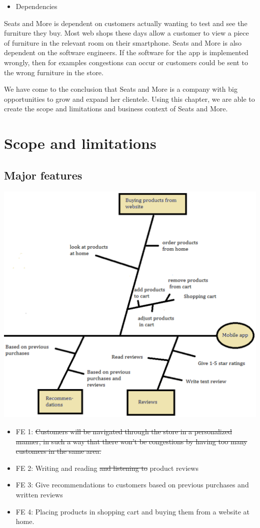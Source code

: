 \documentclass[a4paper]{article}
\begin{document}
\begin{itemize}
\item Dependencies
\end{itemize}
Seats and More is dependent on customers actually wanting to test and see the furniture they buy. Most web shops these days allow a customer to view a piece of furniture in the relevant room on their smartphone.
Seats and More is also dependent on the software engineers. If the software for the app is implemented wrongly, then for examples congestions can occur or customers could be sent to the wrong furniture in the store.

We have come to the conclusion that Seats and More is a company with big opportunities to grow and expand her clientele. Using this chapter, we are able to create the scope and limitations and business context of Seats and More.


\section{Scope and limitations}
\subsection*{Major features}
\includegraphics[scale=0.7]{new_feature_tree.eps}
\begin{itemize}
\item FE 1: \sout{Customers will be navigated through the store in a personalized manner, in such a way that there won't be congestions by having too many customers in the same area.}
\item FE 2: Writing and reading \sout{and listening to} product reviews
\item FE 3: Give recommendations to customers based on previous purchases and written reviews
\item FE 4: Placing products in shopping cart and buying them from a website at home.
\end{itemize}
\end{document}
